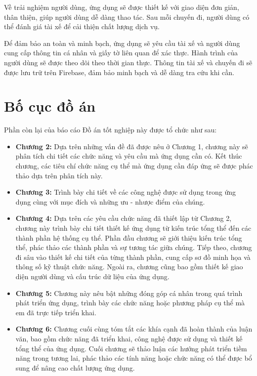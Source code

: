 \documentclass[../DoAn.tex]{subfiles}
\begin{document}
Về trải nghiệm người dùng, ứng dụng sẽ được thiết kế với giao diện đơn giản, thân thiện, giúp người dùng dễ dàng thao tác. Sau mỗi chuyến đi, người dùng có thể đánh giá tài xế để cải thiện chất lượng dịch vụ.

Để đảm bảo an toàn và minh bạch, ứng dụng sẽ yêu cầu tài xế và người dùng cung cấp thông tin cá nhân và giấy tờ liên quan để xác thực. Hành trình của người dùng sẽ được theo dõi theo thời gian thực. Thông tin tài xế và chuyến đi sẽ được lưu trữ trên Firebase, đảm bảo minh bạch và dễ dàng tra cứu khi cần.

\section{Bố cục đồ án}
\label{section:1.4}
Phần còn lại của báo cáo Đồ án tốt nghiệp này được tổ chức như sau: 

\begin{itemize}
  \item \textbf{Chương 2:} Dựa trên những vấn đề đã được nêu ở Chương 1, chương này sẽ phân tích chi tiết các chức năng và yêu cầu mà ứng dụng cần có. Kết thúc chương, các tiêu chí chức năng cụ thể mà ứng dụng cần đáp ứng sẽ được phác thảo dựa trên phân tích này.
  \item \textbf{Chương 3:} Trình bày chi tiết về các công nghệ được sử dụng trong ứng dụng cùng với mục đích và những ưu - nhược điểm của chúng.
  \item \textbf{Chương 4:} Dựa trên các yêu cầu chức năng đã thiết lập từ Chương 2, chương này trình bày chi tiết thiết kế ứng dụng từ kiến trúc tổng thể đến các thành phần hệ thống cụ thể. Phần đầu chương sẽ giới thiệu kiến trúc tổng thể, phác thảo các thành phần và sự tương tác giữa chúng. Tiếp theo, chương đi sâu vào thiết kế chi tiết của từng thành phần, cung cấp sơ đồ minh họa và thông số kỹ thuật chức năng. Ngoài ra, chương cũng bao gồm thiết kế giao diện người dùng và cấu trúc dữ liệu của ứng dụng.
  \item \textbf{Chương 5:} Chương này nêu bật những đóng góp cá nhân trong quá trình phát triển ứng dụng, trình bày các chức năng hoặc phương pháp cụ thể mà em đã trực tiếp triển khai.
  \item \textbf{Chương 6:} Chương cuối cùng tóm tắt các khía cạnh đã hoàn thành của luận văn, bao gồm chức năng đã triển khai, công nghệ được sử dụng và thiết kế tổng thể của ứng dụng. Cuối chương sẽ thảo luận các hướng phát triển tiềm năng trong tương lai, phác thảo các tính năng hoặc chức năng có thể được bổ sung để nâng cao chất lượng ứng dụng.
\end{itemize}
\end{document}
